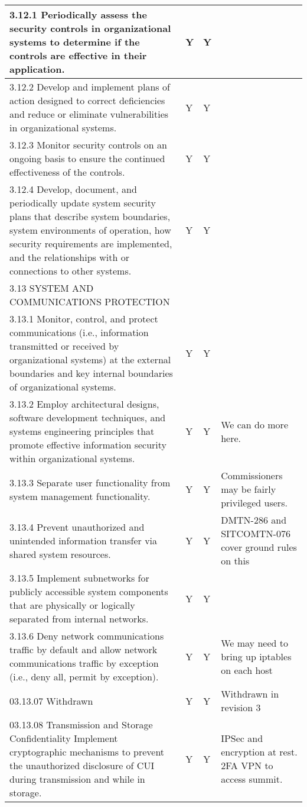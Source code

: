 \begin{longtable} {|p{}|p{}|p{}|p{} |}
{3.12.1 Periodically assess the security controls in organizational systems to determine if the controls are effective in their application.}&{Y}&{Y}& \\ \hline
{3.12.2 Develop and implement plans of action designed to correct deficiencies and reduce or eliminate vulnerabilities in organizational systems.}&{Y}&{Y}& \\ \hline
{3.12.3 Monitor security controls on an ongoing basis to ensure the continued effectiveness of the controls.}&{Y}&{Y}& \\ \hline
{3.12.4 Develop, document, and periodically update system security plans that describe system boundaries, system environments of operation, how security requirements are implemented, and the relationships with or connections to other systems.}&{Y}&{Y}& \\ \hline
{3.13 SYSTEM AND COMMUNICATIONS PROTECTION}&&& \\ \hline
{3.13.1 Monitor, control, and protect communications (i.e., information transmitted or received by organizational systems) at the external boundaries and key internal boundaries of organizational systems.}&{Y}&{Y}& \\ \hline
{3.13.2 Employ architectural designs, software development techniques, and systems engineering principles that promote effective information security within organizational systems.}&{Y}&{Y}&{We can do more here. } \\ \hline
{3.13.3 Separate user functionality from system management functionality.}&{Y}&{Y}&{Commissioners may be fairly privileged users.} \\ \hline
{3.13.4 Prevent unauthorized and unintended information transfer via shared system resources.}&{Y}&{Y}&{DMTN-286 and SITCOMTN-076 cover ground rules on this} \\ \hline
{3.13.5 Implement subnetworks for publicly accessible system components that are physically or logically separated from internal networks.}&{Y}&{Y}& \\ \hline
{3.13.6 Deny network communications traffic by default and allow network communications traffic by exception (i.e., deny all, permit by exception).}&{Y}&{Y}&{We may need to bring up iptables on each host} \\ \hline
{03.13.07 Withdrawn}&{Y}&{Y}&{Withdrawn in revision 3} \\ \hline
{03.13.08 Transmission and Storage Confidentiality
Implement cryptographic mechanisms to prevent the unauthorized disclosure of CUI during transmission and while in storage.}&{Y}&{Y}&{IPSec and encryption at rest. 2FA VPN to access summit.} \\ \hline

\end{longtable}
